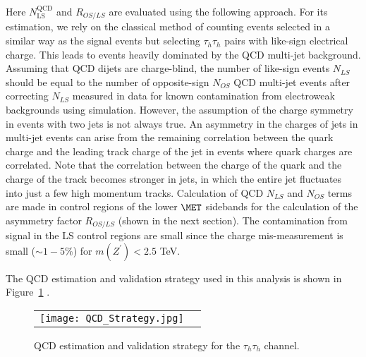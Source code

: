 Here $N_{\textrm{LS}}^{\textrm{QCD}}$ and $R_{OS/LS}$ are evaluated using the following approach. For its estimation, we rely on the classical method of counting events selected in a similar way as the signal events but selecting $\tau_{h}\tau_{h}$ pairs with like-sign electrical charge. This leads to events heavily dominated by the QCD multi-jet background. Assuming that QCD dijets are charge-blind, the number of like-sign events $N_{LS}$ should be equal to the number of opposite-sign $N_{OS}$ QCD multi-jet events after correcting $N_{LS}$ measured in data for known contamination from electroweak backgrounds using simulation. However, the assumption of the charge symmetry in events with two jets is not always true. An asymmetry in the charges of jets in multi-jet events can arise from the remaining correlation
between the quark charge and the leading track charge of the jet in events where quark charges are correlated. 
Note that the correlation between the charge of the quark and the charge of the track
becomes stronger in jets, in which the entire jet fluctuates into just a few high momentum tracks. Calculation of QCD $N_{LS}$ and $N_{OS}$ terms are made in control regions of the lower $\MET$ sidebands for the calculation of the asymmetry factor $R_{OS/LS}$ (shown in the next section). 
The contamination from signal in the LS control regions are small since the charge mis-measurement is small ($\sim 1-5\%$) for $m(Z^{\prime}) < 2.5$ TeV. 

The QCD estimation and validation strategy used in this analysis is shown in Figure~\ref{fig:qcd} .    

 \begin{figure}[tbh!]
     \centering
     \begin{tabular}{cc}
       \texttt{[image: QCD\_Strategy.jpg]}
     \end{tabular}
     \caption{QCD estimation and validation strategy for the $\tau_{h}\tau_{h}$ channel.}
    \label{fig:qcd}
   \end{figure}


